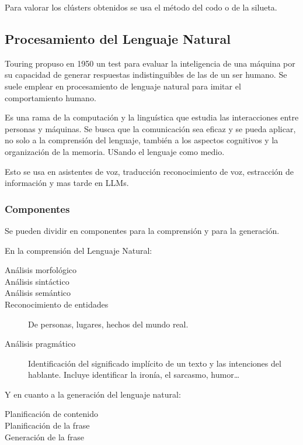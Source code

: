         Para valorar los clústers obtenidos se usa el método del codo o de la silueta.
\subsection{Procesamiento del Lenguaje Natural}
    Touring propuso en 1950 un test para evaluar la inteligencia de una máquina por su capacidad de generar respuestas indistinguibles de las de un ser humano. Se suele emplear en procesamiento de lenguaje natural para imitar el comportamiento humano.

    Es una rama de la computación y la linguística que estudia las interacciones entre personas y máquinas. Se busca que la comunicación sea eficaz y se pueda aplicar, no solo a la comprensión del lenguaje, también a los aspectos cognitivos y la organización de la memoria. USando el lenguaje como medio.

    Esto se usa en asistentes de voz, traducción reconocimiento de voz, estracción de información y mas tarde en LLMs.

    \subsubsection{Componentes}
        Se pueden dividir en componentes para la comprensión y para la generación.

        En la comprensión del Lenguaje Natural:
        \begin{description}
            \item[Análisis morfológico]
            \item[Análisis sintáctico]
            \item[Análisis semántico]
            \item[Reconocimiento de entidades] De personas, lugares, hechos del mundo real.
            \item[Análisis pragmático] Identificación del significado implícito de un texto y las intenciones del hablante. Incluye identificar la ironía, el sarcasmo, humor\dots
        \end{description}

        Y en cuanto a la generación del lenguaje natural:
        \begin{description}
            \item[Planificación de contenido]
            \item[Planificación de la frase]
            \item[Generación de la frase]
        \end{description}

